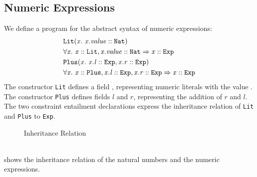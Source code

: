 \subsection{Numeric Expressions}
We define a program for the abstract syntax of numeric expressions:
%
\begin{align*}
&\mathit{\texttt{Lit}}(\mathit{x}.\ \mathit{\mathit{x.value} :: \mathit{\texttt{Nat}}})\\
& \forall \mathit{x}.\ \mathit{\mathit{x} :: \mathit{\texttt{Lit}}, \mathit{x.value} :: \mathit{\texttt{Nat}}} \Rightarrow \mathit{\mathit{x} :: \mathit{\texttt{Exp}}}\\
&\mathit{\texttt{Plus}}(\mathit{x}.\ \mathit{\mathit{x.l} :: \mathit{\texttt{Exp}}, \mathit{x.r} :: \mathit{\texttt{Exp}}})\\
& \forall \mathit{x}.\ \mathit{\mathit{x} :: \mathit{\texttt{Plus}}, \mathit{x.l} :: \mathit{\texttt{Exp}}, \mathit{x.r} :: \mathit{\texttt{Exp}}} \Rightarrow \mathit{\mathit{x} :: \mathit{\texttt{Exp}}}
\end{align*}
%
The constructor \texttt{Lit} defines a field ,
representing numeric literals with the value .
The constructor \texttt{Plus} defines fields $l$ and $r$,
representing the addition of $r$ and $l$.
The two constraint entailment declarations express
the inheritance relation of
\texttt{Lit} and \texttt{Plus} to \texttt{Exp}.
%
\begin{figure}[h]
\begin{center}
\end{center}
\caption{Inheritance Relation}
\label{fig:aexp-inheritance}
\end{figure}\\
 shows the
inheritance relation of the natural numbers
and the numeric expressions.


